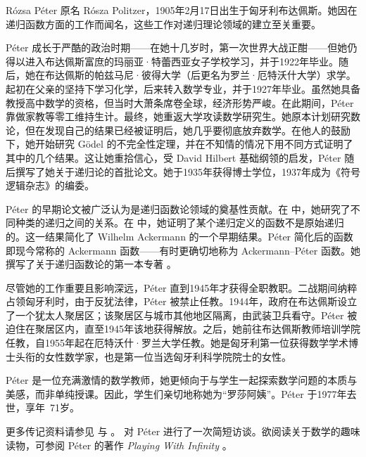 \documentclass[../../../include/open-logic-section]{subfiles}
\begin{document}



R\'ozsa P\'eter 原名 R\'osza Politzer，1905年2月17日出生于匈牙利布达佩斯。她因在递归函数方面的工作而闻名，这些工作对递归理论领域的建立至关重要。

P\'eter 成长于严酷的政治时期——在她十几岁时，第一次世界大战正酣——但她仍得以进入布达佩斯富庶的玛丽亚·特蕾西亚女子学校学习，并于1922年毕业。随后，她在布达佩斯的帕兹马尼·彼得大学（后更名为罗兰·厄特沃什大学）求学。起初在父亲的坚持下学习化学，后来转入数学专业，并于1927年毕业。虽然她具备教授高中数学的资格，但当时大萧条席卷全球，经济形势严峻。在此期间，P\'eter 靠做家教等零工维持生计。最终，她重返大学攻读数学研究生。她原本计划研究数论，但在发现自己的结果已经被证明后，她几乎要彻底放弃数学。在他人的鼓励下，她开始研究 Gödel 的不完全性定理，并在不知情的情况下用不同方式证明了其中的几个结果。这让她重拾信心，受 David Hilbert 基础纲领的启发，P\'eter 随后撰写了她关于递归论的首批论文。她于1935年获得博士学位，1937年成为《符号逻辑杂志》的编委。

P\'eter 的早期论文被广泛认为是递归函数论领域的奠基性贡献。在 \cite{Peter1935a} 中，她研究了不同种类的递归之间的关系。在 \cite{Peter1935b} 中，她证明了某个递归定义的函数不是原始递归的。这一结果简化了 Wilhelm Ackermann 的一个早期结果。P\'eter 简化后的函数即现今常称的 Ackermann 函数——有时更确切地称为 Ackermann--P\'eter 函数。她撰写了关于递归函数论的第一本专著 \citep{Peter1951}。

尽管她的工作重要且影响深远，P\'eter 直到1945年才获得全职教职。二战期间纳粹占领匈牙利时，由于反犹法律，P\'eter 被禁止任教。1944年，政府在布达佩斯设立了一个犹太人聚居区；该聚居区与城市其他地区隔离，由武装卫兵看守。P\'eter 被迫住在聚居区内，直至1945年该地获得解放。之后，她前往布达佩斯教师培训学院任教，自1955年起在厄特沃什·罗兰大学任教。她是匈牙利第一位获得数学学术博士头衔的女性数学家，也是第一位当选匈牙利科学院院士的女性。

P\'eter 是一位充满激情的数学教师，她更倾向于与学生一起探索数学问题的本质与美感，而非单纯授课。因此，学生们亲切地称她为“罗莎阿姨”。P\'eter 于1977年去世，享年~71岁。

\begin{reading}
更多传记资料请参见 \citep{Oconnor2014} 与 \citep{Andrasfai1986}。\citet{Tamassy1994} 对 P\'eter 进行了一次简短访谈。欲阅读关于数学的趣味读物，可参阅 P\'eter 的著作 \emph{Playing With Infinity} \citep{Peter2010}。
\end{reading}
\end{document}
